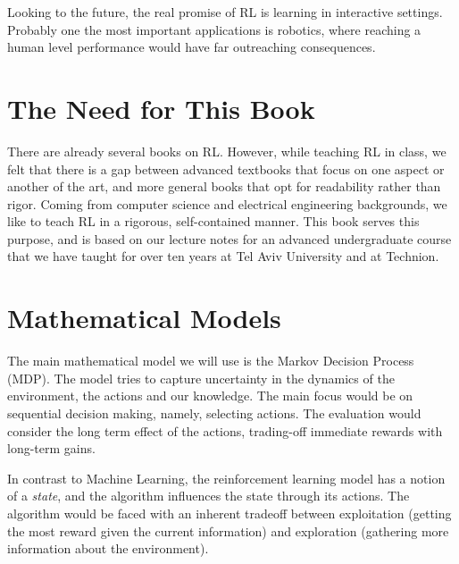 Looking to the future, the real promise of RL
is learning in interactive settings. Probably one the most important
applications is robotics, where reaching a human level performance
would have far outreaching consequences. 

\section{The Need for This Book}

There are already several books on RL. However, while teaching RL in class, we felt that there is a gap between advanced textbooks that focus on one aspect or another of the art, and more general books that opt for readability rather than rigor. Coming from computer science and electrical engineering backgrounds, we like to teach RL in a rigorous, self-contained manner. This book serves this purpose, and is based on our lecture notes for an advanced undergraduate course that we have taught for over ten years at Tel Aviv University and at Technion.


\section{Mathematical Models}
%
The main mathematical model we will use is the Markov Decision Process
(MDP). The model tries to capture uncertainty in the dynamics of the
environment, the actions and our knowledge. The main focus would be
on sequential decision making, namely, selecting actions. The evaluation would
consider the long term effect of the actions, trading-off immediate
rewards with long-term gains.

In contrast to Machine Learning, the reinforcement learning model
 has a notion of a {\em state}, and the algorithm influences the state
through its actions.
The algorithm would be faced with an inherent tradeoff between
exploitation (getting the most reward given the current information)
and exploration (gathering more information about the environment).



